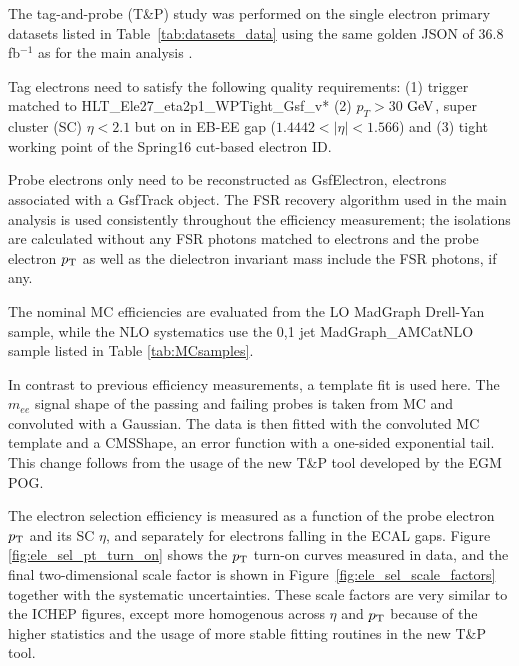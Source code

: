 The tag-and-probe (T\&P) study was performed on the single electron primary datasets listed in Table~\ref{tab:datasets_data} using the same golden JSON of 36.8 
fb$^{-1}$ as for the main analysis \cite{AN-15-277}. 

Tag electrons need to satisfy the following quality requirements:
(1) trigger matched to HLT\_Ele27\_eta2p1\_WPTight\_Gsf\_v*
(2) $p_{T} > 30$ $\mathrm{Ge\kern -0.1em V}$, super cluster (SC) $\eta < 2.1$ but on in EB-EE gap ($1.4442<|\eta|<1.566$)
and (3) tight working point of the Spring16 cut-based electron ID.

Probe electrons only need to be reconstructed as GsfElectron, electrons associated with a GsfTrack object. The FSR recovery algorithm used in the main analysis is used consistently throughout the efficiency measurement; the isolations are calculated without any FSR photons matched to electrons and the probe electron $p_{\rm{T}}$ as well as the dielectron invariant mass include the FSR photons, if any. 


The nominal MC efficiencies are evaluated from the LO MadGraph Drell-Yan sample, while the NLO systematics use the 0,1 jet MadGraph\_AMCatNLO sample listed in Table \ref{tab:MCsamples}.

In contrast to previous efficiency measurements, a template fit is used here. The $m_{ee}$ signal shape of the passing and failing probes is taken from MC and convoluted with a Gaussian. The data is then fitted with the convoluted MC template and a CMSShape, an error function with a one-sided exponential tail. This change follows from the usage of the new T\&P tool developed by the EGM POG.



The electron selection efficiency is measured as a function of the probe electron $p_{\rm{T}}$ and its SC $\eta$, and separately for electrons falling in the ECAL gaps. Figure \ref{fig:ele_sel_pt_turn_on} shows the $p_{\rm{T}}$ turn-on curves measured in data, and the final two-dimensional scale factor is shown in Figure~\ref{fig:ele_sel_scale_factors} together with the systematic uncertainties. These scale factors are very similar to the ICHEP figures, except more homogenous across $\eta$ and $p_{\rm{T}}$ because of the higher statistics and the usage of more stable fitting routines in the new T\&P tool.


